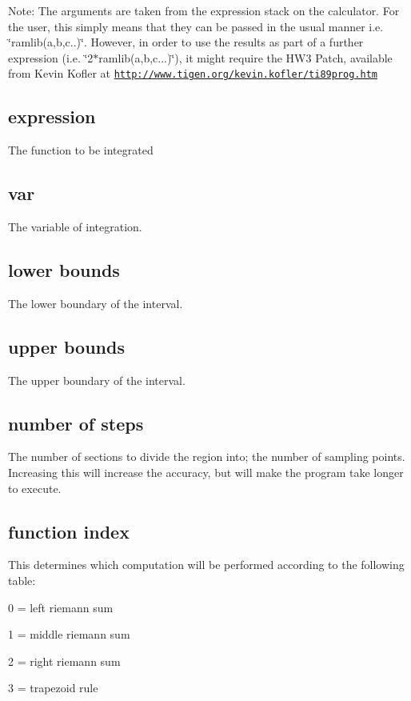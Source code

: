 Note: The arguments are taken from the expression stack on the calculator. For the user, this simply means that they can be passed in the usual manner i.e. \char`\"{}ramlib(a,b,c..)\char`\"{}. However, in order to use the results as part of a further expression (i.e. \char`\"{}2$\ast$ramlib(a,b,c...)\char`\"{}), it might require the HW3 Patch, available from Kevin Kofler at \href{http://www.tigen.org/kevin.kofler/ti89prog.htm}{\tt http://www.tigen.org/kevin.kofler/ti89prog.htm} \hypertarget{index_expression}{}\subsection{expression}\label{index_expression}
The function to be integrated \hypertarget{index_var}{}\subsection{var}\label{index_var}
The variable of integration. \hypertarget{index_lower_bounds}{}\subsection{lower bounds}\label{index_lower_bounds}
The lower boundary of the interval. \hypertarget{index_upper_bounds}{}\subsection{upper bounds}\label{index_upper_bounds}
The upper boundary of the interval. \hypertarget{index_number_of_steps}{}\subsection{number of steps}\label{index_number_of_steps}
The number of sections to divide the region into; the number of sampling points. Increasing this will increase the accuracy, but will make the program take longer to execute. \hypertarget{index_function_index}{}\subsection{function index}\label{index_function_index}
This determines which computation will be performed according to the following table: \par
 0 = left riemann sum \par
 1 = middle riemann sum \par
 2 = right riemann sum \par
 3 = trapezoid rule 